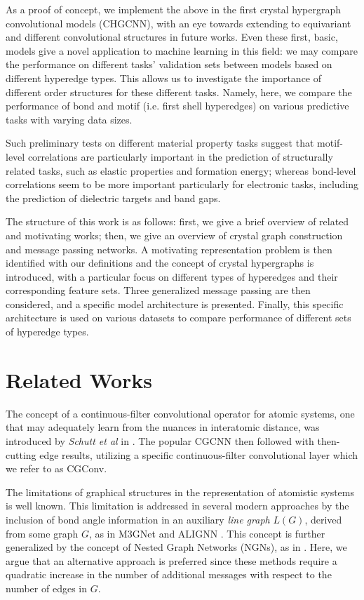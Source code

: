 \documentclass[10pt,a4paper]{article}
\begin{document}
As a proof of concept, we implement the above in the first crystal hypergraph convolutional models (CHGCNN), with an eye towards extending to equivariant and different convolutional structures in future works. Even these first, basic, models give a novel application to machine learning in this field: we may compare the performance on different tasks' validation sets between models based on different hyperedge types. This allows us to investigate the importance of different order structures for these different tasks. Namely, here, we compare the performance of bond and motif (i.e. first shell hyperedges) on various predictive tasks with varying data sizes. 

Such preliminary tests on different material property tasks suggest that motif-level correlations are particularly important in the prediction of  structurally related tasks, such as elastic properties and formation energy; whereas bond-level correlations seem to be more important particularly for electronic tasks, including the prediction of dielectric targets and band gaps.

The structure of this work is as follows: first, we give a brief overview of related and motivating works; then, we give an overview of crystal graph construction and message passing networks. A motivating representation problem is then identified with our definitions and the concept of crystal hypergraphs is introduced, with a particular focus on different types of hyperedges and their corresponding feature sets. Three generalized message passing are then considered, and a specific model architecture is presented. Finally, this specific architecture is used on various datasets to compare performance of different sets of hyperedge types.

\section{Related Works}
The concept of a continuous-filter convolutional operator for atomic systems, one that may adequately learn from the nuances in interatomic distance, was introduced by \textit{Schutt et al} in \cite{schnet}. The popular CGCNN then followed with then-cutting edge results, utilizing a specific continuous-filter convolutional layer which we refer to as CGConv. 

The limitations of graphical structures in the representation of atomistic systems is well known. This limitation is addressed in several modern approaches by the inclusion of bond angle information in an auxiliary \textit{line graph} $L(G)$, derived from some graph $G$, as in M3GNet \cite{m3gnet} and ALIGNN \cite{alignn}. This concept is further generalized by the concept of Nested Graph Networks (NGNs), as in \cite{congn}. Here, we argue that an alternative approach is preferred since these methods require a quadratic increase in the number of additional messages with respect to the number of edges in $G$.
\end{document}
